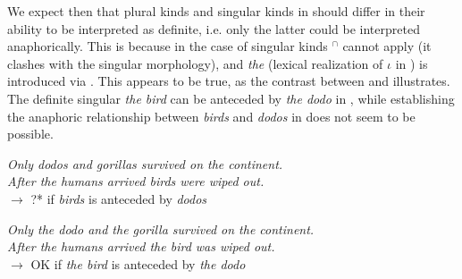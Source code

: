 \documentclass[output=paper,
modfonts
]{langscibook}
\begin{document}
	We expect then that plural kinds and singular kinds in  should differ in their ability to be interpreted as definite, i.e. only the latter could be interpreted anaphorically.
	This is because in the case of singular kinds $^\cap$ cannot apply (it clashes with the singular  morphology), and \textit{the} (lexical realization of $\iota$ in ) is introduced via .
	This appears to be true, as the contrast between  and  illustrates. The definite singular \textit{the bird} can be anteceded by \textit{the dodo} in , while establishing the anaphoric relationship between  \textit{birds} and \textit{dodos} in  does not seem to be possible.
	
	\ea \label{ex:despic:44} 
	\textit{Only dodos and gorillas survived on the continent.} \\
	\textit{After the humans arrived birds were wiped out.} \\
	$\rightarrow$ ?* if \textit{birds} is anteceded by \textit{dodos}
	\z 
	
	\ea \label{ex:despic:45}
	\textit{Only the dodo and the gorilla survived on the continent.} \\
	\textit{After the humans arrived the bird was wiped out.} \\
	$\rightarrow$ OK if \textit{the bird} is anteceded by \textit{the dodo}
	\z
	
\end{document}
